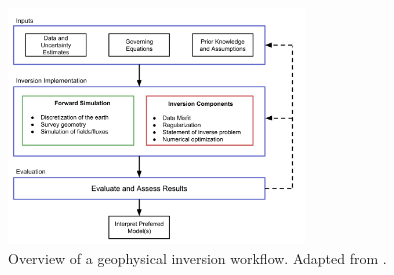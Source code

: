 \begin{figure}
    \begin{center}
    \includegraphics[width=0.7\textwidth]{figures/intro/inversion_workflow_bullets.png}
    \end{center}
\caption{
    Overview of a geophysical inversion workflow. Adapted from \cite{Cockett2015}.
}
\label{fig:inversion_workflow_bullets}
\end{figure}
